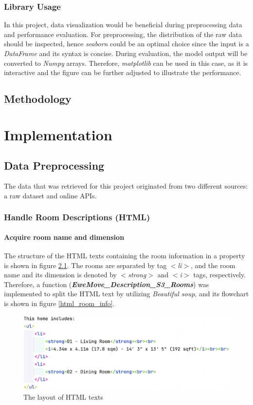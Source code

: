 \documentclass[12pt,twoside]{report}
\begin{document}
\subsection{Library Usage}
In this project, data visualization would be beneficial during preprocessing data and performance evaluation. For preprocessing, the distribution of the raw data should be inspected, hence \textit{seaborn} could be an optimal choice since the input is a \textit{DataFrame} and its syntax is concise. During evaluation, the model output will be converted to \textit{Numpy} arrays. Therefore, \textit{matplotlib} can be used in this case, as it is interactive and the figure can be further adjusted to illustrate the performance. 

\section{Methodology}

\chapter{Implementation}
\section{Data Preprocessing}
The data that was retrieved for this project originated from two different sources: a raw dataset and online APIs. 

\subsection{Handle Room Descriptions (HTML)}

\subsubsection{Acquire room name and dimension}
The structure of the HTML texts containing the room information in a property is shown in figure \ref{html_structure}. The rooms are separated by tag \textit{$<$li$>$}, and the room name and its dimension is denoted by \textit{$<$strong$>$} and \textit{$<$i$>$} tags, respectively. Therefore, a function (\textit{\textbf{EweMove\_Description\_S3\_Rooms}}) was implemented to split the HTML text by utilizing \textit{Beautiful soup}, and its flowchart is shown in figure \ref{html_room_info}.
\begin{figure}[h]
	\centering
	\includegraphics[width=15cm]{html_structure}
	\caption{The layout of HTML texts}
	\label{html_structure}
\end{figure}
\end{document}
